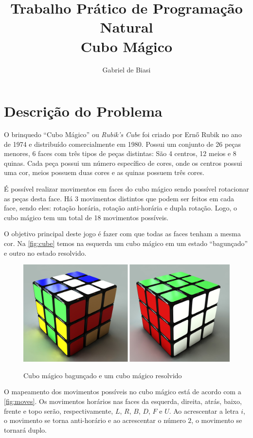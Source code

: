 \documentclass[12pt]{article}
\title{Trabalho Prático de Programação Natural\\Cubo Mágico}
\author{Gabriel de Biasi\inst{1}}
\begin{document}
\maketitle

\section{Descrição do Problema}
  O brinquedo ``Cubo Mágico'' ou \textit{Rubik's Cube} foi criado por Ernő Rubik no ano de  1974 e distribuído comercialmente em 1980. Possui um conjunto de 26 peças menores, 6 faces com três tipos de peças distintas: São 4 centros, 12 meios e 8 quinas. Cada peça possui um número específico de cores, onde os centros possui uma cor, meios possuem duas cores e as quinas possuem três cores.

  É possível realizar movimentos em faces do cubo mágico sendo possível rotacionar as peças desta face. Há 3 movimentos distintos que podem ser feitos em cada face, sendo eles: rotação horária, rotação anti-horária e dupla rotação. Logo, o cubo mágico tem um total de 18 movimentos possíveis.

  O objetivo principal deste jogo é fazer com que todas as faces tenham a mesma cor. Na \autoref{fig:cube} temos na esquerda um cubo mágico em um estado ``bagunçado'' e outro no estado resolvido.

  \begin{figure}[!ht]
    \centering
    \caption{Cubo mágico bagunçado e um cubo mágico resolvido}
    \includegraphics[scale=0.3]{images/cube.png}
    \label{fig:cube}
  \end{figure}

  O mapeamento dos movimentos possíveis no cubo mágico está de acordo com a \autoref{fig:moves}. Os movimentos horários nas faces da esquerda, direita, atrás, baixo, frente e topo serão, respectivamente, $L$, $R$, $B$, $D$, $F$ e $U$. Ao acrescentar a letra $i$, o movimento se torna anti-horário e ao acrescentar o número $2$, o movimento se tornará duplo.
\end{document}
